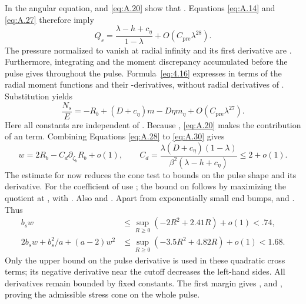 In the angular equation,  and
\eqref{eq:A.20} show that
. Equations
\eqref{eq:A.14} and \eqref{eq:A.27} therefore imply
\begin{equation}
 Q_s=\frac{\lambda-h+c_\eta}{1-\lambda}+O(C_{\mathrm{pre}}\lambda^{28}).
 \tag{A.29}\label{eq:A.29}
\end{equation}
The pressure normalized to vanish at radial infinity and its first
 derivative are . Furthermore,
integrating  and the moment discrepancy accumulated
before the pulse gives
 throughout the
pulse. Formula~\eqref{eq:4.16} expresses  in terms of the radial
moment functions and their -derivatives, without radial derivatives
of . Substitution yields
\begin{equation}
 \frac{N_s}{E}=-R_b+(D+c_\eta)m-D\eta m_\eta+O(C_{\mathrm{pre}}\lambda^{27}).
 \tag{A.30}\label{eq:A.30}
\end{equation}
Here all constants are independent of . Because
, \eqref{eq:A.20} makes
the contribution of  an
 term. Combining Equations \eqref{eq:A.28} to \eqref{eq:A.30}
gives
\[
 w=2R_b-C_d\partial_{\zeta_b}R_b+o(1),
 \qquad C_d=\frac{\lambda(D+c_\eta)(1-\lambda)}{\beta^2(\lambda-h+c_\eta)}\leq2+o(1).
\]
The estimate for  now reduces the cone test to bounds on the pulse
shape and its derivative. For the coefficient of  use
; the bound on
 follows by maximizing the quotient at
, with . Also
 and
. Apart from exponentially small end bumps,
 and . Thus
\[
\begin{aligned}
 b_sw&\leq\sup_{R\geq0}(-2R^2+2.41R)+o(1)<.74,\\
 2b_sw+b_s^2/a+(a-2)w^2
   &\leq\sup_{R\geq0}(-3.5R^2+4.82R)+o(1)<1.68.
\end{aligned}
\]
Only the upper bound on the pulse derivative is used in these quadratic cross terms; its
negative derivative near the cutoff decreases the left-hand sides. All derivatives remain
bounded by fixed constants. The first margin gives , and
, proving the admissible stress cone on the whole pulse.

